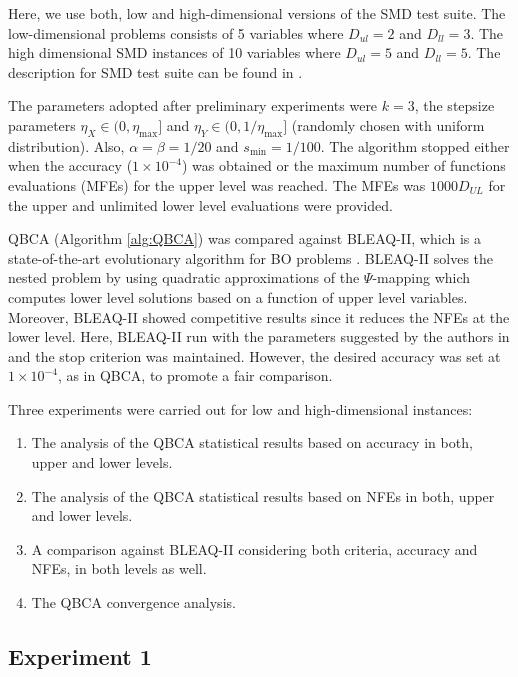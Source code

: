 \documentclass[conference]{IEEEtran}
\theoremstyle{definition}
\begin{document}
Here, we use both, low and high-dimensional versions of the SMD test suite. The
low-dimensional problems consists of 5 variables where $D_{ul} = 2$ and $D_{ll}  = 3$.
The high dimensional SMD instances of 10 variables where $D_{ul} = 5$ and $D_{ll}  = 5$.
The description for SMD test suite can be found in \cite{sinha2014test}.


The parameters adopted after preliminary experiments were $k = 3$, the stepsize
parameters $\eta_{X} \in (0, \eta_{\max}]$ and $\eta_{Y} \in (0, 1/\eta_{\max}]$
(randomly chosen with uniform distribution). Also, $\alpha = \beta = 1 / 20$ and
$s_{\min} = 1/100$.  The  algorithm stopped either when the accuracy ($1\times 10^{-4}$)
was obtained or the maximum number of functions evaluations (MFEs) for the upper
level was reached.
% 
% 
The MFEs was $1000D_{UL}$ for the upper and unlimited lower level evaluations were
provided.
% 


% 
QBCA (Algorithm \ref{alg:QBCA}) was compared against BLEAQ-II, which is a state-of-the-art
evolutionary algorithm for BO problems \cite{sinha2018review,sinha2013efficient}.
BLEAQ-II solves the nested problem by using quadratic approximations of the
$\Psi$-mapping which computes lower level solutions based on a function of upper
level variables. Moreover, BLEAQ-II showed competitive results since it reduces
the NFEs at the lower level. Here, BLEAQ-II run with the parameters suggested by
the authors in \cite{sinha2018review,sinha2017bilevel} and the stop criterion was
maintained.  However, the desired accuracy was set at $1\times 10^{-4}$, as in
QBCA, to promote a fair comparison.

Three experiments were carried out for low and high-dimensional instances:
% 
\begin{enumerate}
    \item The analysis of the QBCA statistical results based on accuracy in both,
          upper and lower levels.
    \item The analysis of the QBCA statistical results based on NFEs in both,
          upper and lower levels. 
    \item A comparison against BLEAQ-II considering both criteria, accuracy and
          NFEs, in both levels as well.
    \item  The QBCA convergence analysis.
\end{enumerate}
% 


\subsection{Experiment 1}
\end{document}
